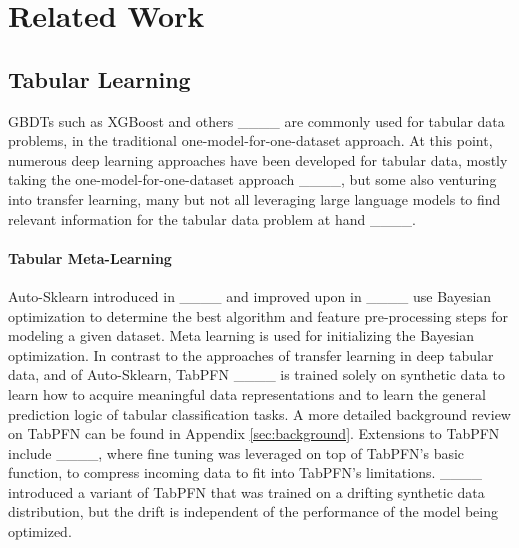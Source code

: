 \section{Related Work}
\label{sec:related-work}

\subsection{Tabular Learning}


GBDTs such as XGBoost and others ____ are commonly used for tabular data problems, in the traditional one-model-for-one-dataset approach. At this point, numerous deep learning approaches have been developed for tabular data, mostly taking the one-model-for-one-dataset approach ____, but some also venturing into transfer learning, many but not all leveraging large language models to find relevant information for the tabular data problem at hand ____.









\paragraph{Tabular Meta-Learning} Auto-Sklearn introduced in ____ and improved upon in ____ use Bayesian optimization to determine the best algorithm and feature pre-processing steps for modeling a given dataset. Meta learning is used for initializing the Bayesian optimization. In contrast to the approaches of transfer learning in deep tabular data, and of Auto-Sklearn, TabPFN ____ is trained solely on synthetic data to learn how to acquire meaningful data representations and to learn the general prediction logic of tabular classification tasks. A more detailed background review on TabPFN can be found in Appendix \ref{sec:background}. Extensions to TabPFN include ____, where fine tuning was leveraged on top of TabPFN's basic function, to compress incoming data to fit into TabPFN's limitations. ____ introduced a variant of TabPFN that was trained on a drifting synthetic data distribution, but the drift is independent of the performance of the model being optimized.


